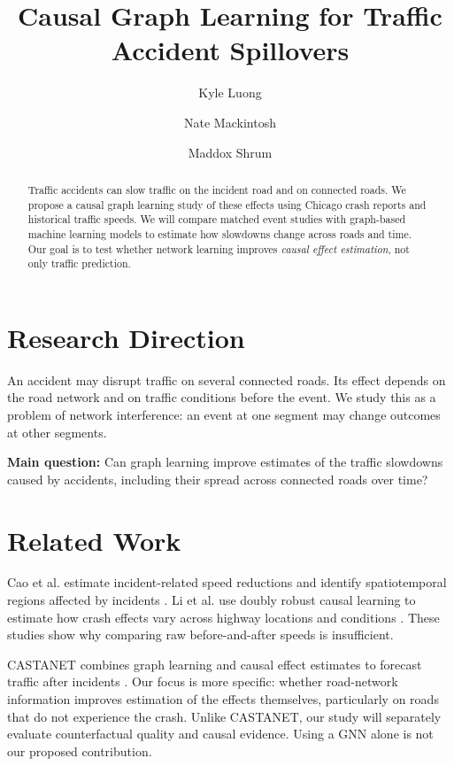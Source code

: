 \documentclass[sigconf,nonacm]{acmart}
\title[Traffic Accident Spillovers]{Causal Graph Learning for Traffic Accident Spillovers}
\author{Kyle Luong}
\affiliation{\institution{University of Virginia}\city{Charlottesville}\state{Virginia}\country{USA}}
\author{Nate Mackintosh}
\affiliation{\institution{University of Virginia}\city{Charlottesville}\state{Virginia}\country{USA}}
\author{Maddox Shrum}
\affiliation{\institution{University of Virginia}\city{Charlottesville}\state{Virginia}\country{USA}}
\begin{document}
\begin{abstract}
Traffic accidents can slow traffic on the incident road and on connected roads. We propose a causal graph learning study of these effects using Chicago crash reports and historical traffic speeds. We will compare matched event studies with graph-based machine learning models to estimate how slowdowns change across roads and time. Our goal is to test whether network learning improves \emph{causal effect estimation}, not only traffic prediction.
\end{abstract}

\maketitle

\section{Research Direction}
An accident may disrupt traffic on several connected roads. Its effect depends on the road network and on traffic conditions before the event. We study this as a problem of network interference: an event at one segment may change outcomes at other segments.

\noindent\textbf{Main question:} Can graph learning improve estimates of the traffic slowdowns caused by accidents, including their spread across connected roads over time?

\section{Related Work}
Cao et al. estimate incident-related speed reductions and identify spatiotemporal regions affected by incidents \cite{cao2021traffic}. Li et al. use doubly robust causal learning to estimate how crash effects vary across highway locations and conditions \cite{li2024crash}. These studies show why comparing raw before-and-after speeds is insufficient.

CASTANET combines graph learning and causal effect estimates to forecast traffic after incidents \cite{kitahara2026castanet}. Our focus is more specific: whether road-network information improves estimation of the effects themselves, particularly on roads that do not experience the crash. Unlike CASTANET, our study will separately evaluate counterfactual quality and causal evidence. Using a GNN alone is not our proposed contribution.
\end{document}
